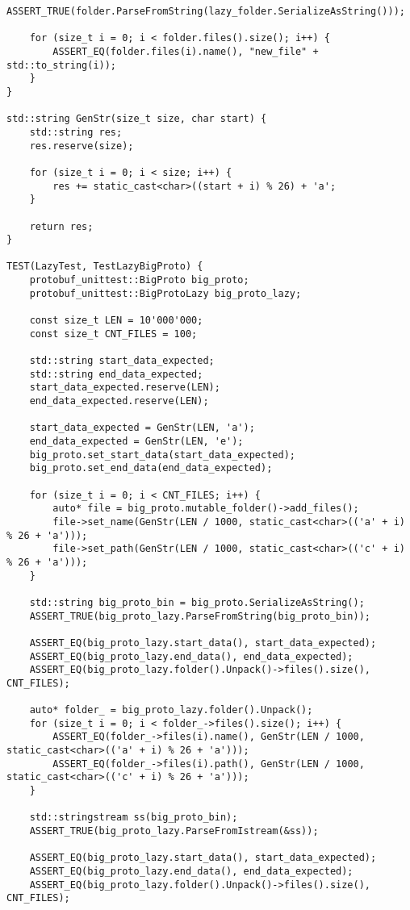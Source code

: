\begin{lstlisting}[style=CodeListing, label=sec_testing:code:tests, caption={Реализация тестов с помощью фреймворка Google Test}]
    ASSERT_TRUE(folder.ParseFromString(lazy_folder.SerializeAsString()));

    for (size_t i = 0; i < folder.files().size(); i++) {
        ASSERT_EQ(folder.files(i).name(), "new_file" + std::to_string(i));
    }
}

std::string GenStr(size_t size, char start) {
    std::string res;
    res.reserve(size);

    for (size_t i = 0; i < size; i++) {
        res += static_cast<char>((start + i) % 26) + 'a';
    }

    return res;
}

TEST(LazyTest, TestLazyBigProto) {
    protobuf_unittest::BigProto big_proto;
    protobuf_unittest::BigProtoLazy big_proto_lazy;

    const size_t LEN = 10'000'000;
    const size_t CNT_FILES = 100;

    std::string start_data_expected;
    std::string end_data_expected;
    start_data_expected.reserve(LEN);
    end_data_expected.reserve(LEN);

    start_data_expected = GenStr(LEN, 'a');
    end_data_expected = GenStr(LEN, 'e');
    big_proto.set_start_data(start_data_expected);
    big_proto.set_end_data(end_data_expected);

    for (size_t i = 0; i < CNT_FILES; i++) {
        auto* file = big_proto.mutable_folder()->add_files();
        file->set_name(GenStr(LEN / 1000, static_cast<char>(('a' + i) % 26 + 'a')));
        file->set_path(GenStr(LEN / 1000, static_cast<char>(('c' + i) % 26 + 'a')));
    }

    std::string big_proto_bin = big_proto.SerializeAsString();
    ASSERT_TRUE(big_proto_lazy.ParseFromString(big_proto_bin));

    ASSERT_EQ(big_proto_lazy.start_data(), start_data_expected);
    ASSERT_EQ(big_proto_lazy.end_data(), end_data_expected);
    ASSERT_EQ(big_proto_lazy.folder().Unpack()->files().size(), CNT_FILES);

    auto* folder_ = big_proto_lazy.folder().Unpack();
    for (size_t i = 0; i < folder_->files().size(); i++) {
        ASSERT_EQ(folder_->files(i).name(), GenStr(LEN / 1000, static_cast<char>(('a' + i) % 26 + 'a')));
        ASSERT_EQ(folder_->files(i).path(), GenStr(LEN / 1000, static_cast<char>(('c' + i) % 26 + 'a')));
    }

    std::stringstream ss(big_proto_bin);
    ASSERT_TRUE(big_proto_lazy.ParseFromIstream(&ss));

    ASSERT_EQ(big_proto_lazy.start_data(), start_data_expected);
    ASSERT_EQ(big_proto_lazy.end_data(), end_data_expected);
    ASSERT_EQ(big_proto_lazy.folder().Unpack()->files().size(), CNT_FILES);


\end{lstlisting}
